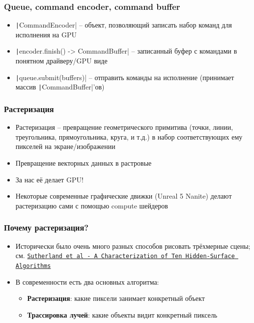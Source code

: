 \documentclass[10pt]{beamer}
\begin{document}
\begin{frame}
\frametitle{Queue, command encoder, command buffer}
\begin{itemize}
\item \texttt|CommandEncoder| -- объект, позволяющий записать набор команд для исполнения на GPU
\pause
\item \texttt|encoder.finish() -> CommandBuffer| -- записанный буфер с командами в понятном драйверу/GPU виде
\pause
\item \texttt|queue.submit(buffers)| -- отправить команды на исполнение (принимает массив \texttt|CommandBuffer|'ов)
\end{itemize}
\end{frame}

\begin{frame}
\frametitle{Растеризация}
\begin{itemize}
\item Растеризация -- превращение геометрического примитива (точки, линии, треугольника, прямоугольника, круга, и т.д.) в набор соответствующих ему пикселей на экране/изображении
\pause
\item Превращение векторных данных в растровые
\pause
\item За нас её делает GPU!
\pause
\item Некоторые современные графические движки (Unreal 5 Nanite) делают растеризацию сами с помощью compute шейдеров
\end{itemize}
\end{frame}

\begin{frame}
\frametitle{Почему растеризация?}
\begin{itemize}
\item Исторически было очень много разных способов рисовать трёхмерные сцены; см. \href{https://dl.acm.org/doi/pdf/10.1145/356625.356626}{\texttt{Sutherland et al - A Characterization of Ten Hidden-Surface Algorithms}}
\pause
\item В современности есть два основных алгоритма:
\pause
\begin{itemize}
\item \textbf{Растеризация}: какие пиксели занимает конкретный объект
\pause
\item \textbf{Трассировка лучей}: какие объекты видит конкретный пиксель
\end{itemize}
\end{itemize}
\end{frame}
\end{document}
